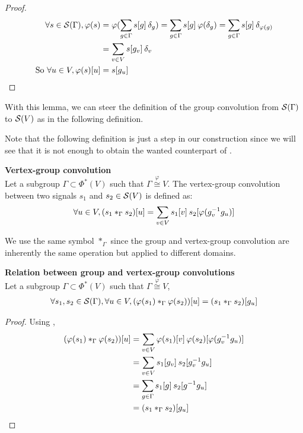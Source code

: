 \begin{proof}
\begin{align*}
\forall s \in \cs(\Gamma), \varphi(s) & = \varphi(\displaystyle \sum_{g \in \Gamma} s[g] \h{2} \delta_g)
 = \displaystyle \sum_{g \in \Gamma} s[g] \h{2} \varphi(\delta_g)
 = \displaystyle \sum_{g \in \Gamma} s[g] \h{2} \delta_{\varphi(g)}\\
 & = \displaystyle \sum_{v \in V} s[g_v] \h{2} \delta_v\\
 \text{So }\forall u \in V, \varphi(s) [u] & = s[g_u]
\end{align*}
\end{proof}

With this lemma, we can steer the definition of the group convolution from $\cs(\Gamma)$ to $\cs(V)$ as in the following definition.

\begin{remark}
Note that the following definition is just a step in our construction since we will see that it is not enough to obtain the wanted counterpart of .
\end{remark}

\begin{definition}\textbf{Vertex-group convolution}\\
Let a subgroup $\Gamma \subset \Phi^*(V)$ such that $\Gamma \overset{\varphi}{\cong} V$.
The vertex-group convolution between two signals $s_1$ and $s_2 \in \cs(V)$ is defined as:
\begin{gather*}
\forall u \in V, (s_1 \ast_{\Gamma} s_2) [u] = \displaystyle \sum_{v \in V} s_1[v] \h{2} s_2[\varphi(g_v^{-1}g_u)]
\end{gather*}
\label{def:conv2}
\end{definition}

We use the same symbol $\ast_\Gamma$ since the group and vertex-group convolution are inherently the same operation but applied to different domains.

\begin{lemma}\textbf{Relation between group and vertex-group convolutions}\\
Let a subgroup $\Gamma \subset \Phi^*(V)$ such that $\Gamma \overset{\varphi}{\cong} V$,
\begin{gather*}
\forall s_1, s_2 \in \cs(\Gamma), \forall u \in V,
(\varphi(s_1) \ast_{\Gamma} \varphi(s_2))[u] = (s_1 \ast_{\Gamma} s_2)[g_u]
\end{gather*}
\label{lem:rel12}
\end{lemma}
\begin{proof}
Using ,
\begin{align*}
(\varphi(s_1) \ast_{\Gamma} \varphi(s_2))[u] & = \displaystyle \sum_{v \in V} \varphi(s_1)[v] \h{2} \varphi(s_2)[\varphi(g_v^{-1}g_u)]\\
 & = \displaystyle \sum_{v \in V} s_1[g_v] \h{2} s_2[g_v^{-1}g_u]\\
 & = \displaystyle \sum_{g \in \Gamma} s_1[g] \h{2} s_2[g^{-1}g_u]\\
 & = (s_1 \ast_{\Gamma} s_2)[g_u]
\end{align*}
\end{proof}

